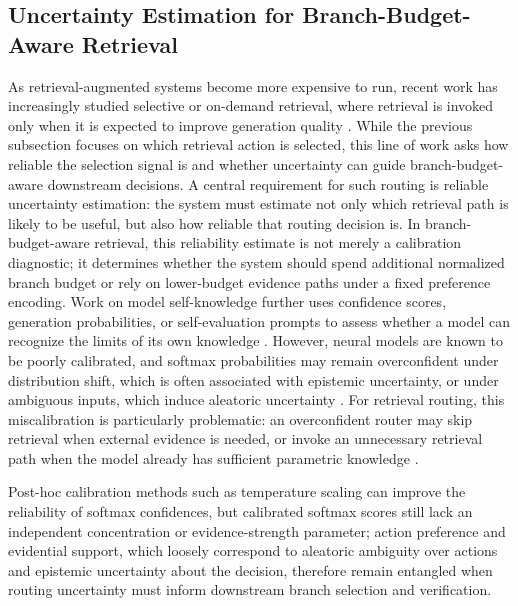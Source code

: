 \documentclass[a4paper,fleqn]{cas-dc}
\begin{document}
\subsection{Uncertainty Estimation for Branch-Budget-Aware Retrieval}
\label{subsec:uncertainty_budget_aware_retrieval}
As retrieval-augmented systems become more expensive to run, recent work has increasingly studied selective or on-demand retrieval, where retrieval is invoked only when it is expected to improve generation quality \citep{Jiang2023FLARE,Asai2023SelfRAG,Mallen2023Trust}. 
While the previous subsection focuses on which retrieval action is selected, this line of work asks how reliable the selection signal is and whether uncertainty can guide branch-budget-aware downstream decisions.
A central requirement for such routing is reliable uncertainty estimation: the system must estimate not only which retrieval path is likely to be useful, but also how reliable that routing decision is. 
In branch-budget-aware retrieval, this reliability estimate is not merely a calibration diagnostic; it determines whether the system should spend additional normalized branch budget or rely on lower-budget evidence paths under a fixed preference encoding.
Work on model self-knowledge further uses confidence scores, generation probabilities, or self-evaluation prompts to assess whether a model can recognize the limits of its own knowledge \citep{Yin2023Know}. 
However, neural models are known to be poorly calibrated, and softmax probabilities may remain overconfident under distribution shift, which is often associated with epistemic uncertainty, or under ambiguous inputs, which induce aleatoric uncertainty \citep{Guo2017Calibration,Zhao2021Calibrate,Kendall2017Uncertainties}. 
For retrieval routing, this miscalibration is particularly problematic: an overconfident router may skip retrieval when external evidence is needed, or invoke an unnecessary retrieval path when the model already has sufficient parametric knowledge \citep{Mallen2023Trust}.

Post-hoc calibration methods such as temperature scaling \citep{Guo2017Calibration} can improve the reliability of softmax confidences, but calibrated softmax scores still lack an independent concentration or evidence-strength parameter; action preference and evidential support, which loosely correspond to aleatoric ambiguity over actions and epistemic uncertainty about the decision, therefore remain entangled when routing uncertainty must inform downstream branch selection and verification.
\end{document}

